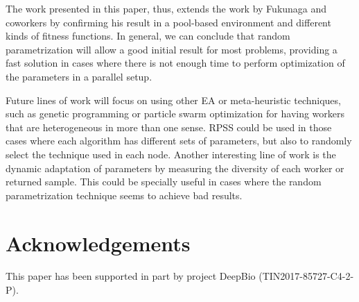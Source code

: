 \documentclass[conference]{IEEEtran}
\begin{document}
The work presented in this paper, thus, extends the work by Fukunaga
and coworkers by confirming his result in a pool-based environment and
different kinds of fitness functions. In general, we can conclude that
random parametrization will allow a good initial result for most
problems, providing a fast solution in cases where there is not enough
time to perform optimization of the parameters in a parallel setup.

Future lines of work will focus on using other EA or meta-heuristic techniques,
such as genetic programming or particle swarm optimization for having
workers that are heterogeneous in more than one sense. RPSS could be
used in those cases where each algorithm has different sets of
parameters, but also to randomly select the technique used in each
node. Another interesting line of work is the dynamic adaptation of
parameters by measuring the diversity of each worker or returned
sample. This could be specially useful in cases where the random
parametrization technique seems to achieve bad results.

\section*{Acknowledgements}

This paper has been supported in part by project DeepBio (TIN2017-85727-C4-2-P).






\end{document}
